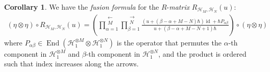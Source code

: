 \documentclass[10pt]{amsart}
\theoremstyle{definition}
\newtheorem{Corollary}[Theorem]{Corollary}
\numberwithin{equation}{section}
\newcommand{\cH}{\mathcal{H}}
\newcommand{\End}{\operatorname{End}}
\newcommand{\id}{\operatorname{id}}
\begin{document}
\begin{Corollary}\label{cor fusion formula}
We have the \textit{fusion formula} for the $R$-\textit{matrix} $R_{\cH_M,\cH_N}(u)$:
\begin{align*}
    (\eta\otimes \eta)\circ R_{\cH_M,\cH_N}(u)= \left(\prod_{\alpha=1}^{\substack{\longleftarrow\\ M}}\prod_{\beta=1}^{\substack{\longrightarrow\\ N}}\frac{(u+(\beta-\alpha+M-N)\hbar)\id+\hbar P_{\alpha\beta}}{u+(\beta-\alpha+M-N+1)\hbar}\right)\circ (\eta\otimes \eta)
\end{align*}
where $P_{\alpha\beta}\in \End\left(\cH_1^{\otimes M}\otimes \cH_1^{\otimes N}\right)$ is the operator that permutes the $\alpha$-th component in $\cH_1^{\otimes M}$ and $\beta$-th component in $\cH_1^{\otimes N}$, and the product is ordered such that index increases along the arrows.
\end{Corollary}
\end{document}

